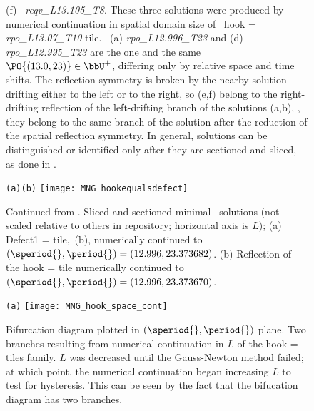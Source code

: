 \begin{itemize}
\begin{figure}
{(f) \reqv\ \emph{reqv\_L13.105\_T8}.
These three solutions were produced by numerical continuation in spatial
domain size of \twot\ hook = \emph{rpo\_L13.07\_T10} tile.
\twoTs\
(a) \emph{rpo\_L12.996\_T23} and
(d) \emph{rpo\_L12.995\_T23}
are the one and the same $\PO{(13.0,23)}\in\bbU^+$, differing only by
relative space and time shifts. The reflection symmetry is broken by the
nearby solution drifting either to the left or to the right, so (e,f)
belong to the right-drifting reflection of the left-drifting branch of
the solutions (a,b), \ie, they belong to the same branch of the
solution after the reduction of the spatial reflection symmetry.
In general, solutions can be distinguished or identified only after they
are sectioned and sliced, as done in \reffig{fig:MNG_hookequalsdefect}.
}
\end{figure}

\begin{figure}
\begin{minipage}[height=.32\textheight]{.8\textwidth}
\centering \small{\texttt{(a)}\qquad\qquad\texttt{(b)}}
\texttt{[image: MNG\_hookequalsdefect]}
\end{minipage}
\caption{ \label{fig:MNG_hookequalsdefect}
Continued from .
Sliced and sectioned minimal \twot\ solutions (not scaled relative to
others in repository; horizontal axis is $L$);
(a) Defect1 =  %
tile,
\,(b), numerically continued to
$(\speriod{},\period{})=(12.996,23.373682)$.
(b) Reflection of the hook  =  %
tile numerically
continued to $(\speriod{},\period{}) = (12.996,23.373670)$.
}
\end{figure}

\begin{figure}
\begin{minipage}[height=.20\textheight]{.8\textwidth}
\centering \small{\texttt{(a)}}
\texttt{[image: MNG\_hook\_space\_cont]}
\end{minipage}
\caption{ \label{fig:MNG_hook_spatial_cont}
Bifurcation diagram plotted in $(\speriod{},\period{})$ plane.
Two branches resulting from numerical continuation in $L$ of
the hook  =  %
tiles family. $L$ was decreased until the
Gauss-Newton method failed; at which point, the numerical continuation
began increasing $L$ to test for hysteresis. This can be seen by the fact
that the bifucation diagram has two branches.
}
\end{figure}


\end{itemize}
